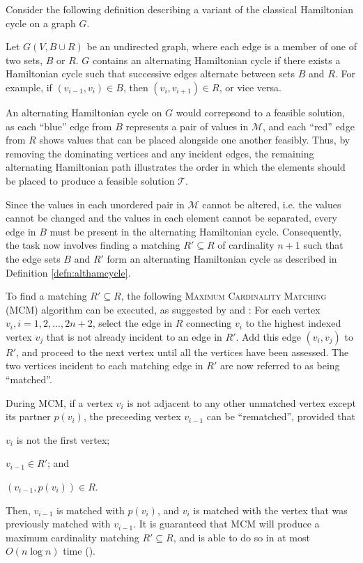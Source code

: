 \documentclass[oribibl]{llncs}
\begin{document}
Consider the following definition describing a variant of the classical Hamiltonian cycle on a graph $G$.
\begin{definition}
	\label{defn:althamcycle}
	Let $G(V, B\cup R)$ be an undirected graph, where each edge is a member of one of two sets, $B$ or $R$. $G$ contains an alternating Hamiltonian cycle if there exists a Hamiltonian cycle such that successive edges alternate between sets $B$ and $R$. For example, if $(v_{i-1}, v_i) \in B$, then $(v_i, v_{i+1}) \in R$, or vice versa.
\end{definition}

An alternating Hamiltonian cycle on $G$ would correpsond to a feasible solution, as each ``blue'' edge from $B$ represents a pair of values in $\mathcal{M}$, and each ``red'' edge from $R$ shows values that can be placed alongside one another feasibly. Thus, by removing the dominating vertices and any incident edges, the remaining alternating Hamiltonian path illustrates the order in which the elements should be placed to produce a feasible solution $\mathcal{T}$.

Since the values in each unordered pair in $\mathcal{M}$ cannot be altered, i.e. the values cannot be changed and the values in each element cannot be separated, every edge in $B$ must be present in the alternating Hamiltonian cycle. Consequently, the task now involves finding a matching $R' \subseteq R$ of cardinality $n+1$ such that the edge sets $B$ and $R'$ form an alternating Hamiltonian cycle as described in Definition \ref{defn:althamcycle}. 

To find a matching $R' \subseteq R$, the following \textsc{Maximum Cardinality Matching} (MCM) algorithm can be executed, as suggested by \cite{mahadev1994} and \cite{becker2010}: For each vertex $v_i, i=1,2,...,2n+2$, select the edge in $R$ connecting $v_i$ to the highest indexed vertex $v_j$ that is not already incident to an edge in $R'$. Add this edge $(v_i, v_j)$ to $R'$, and proceed to the next vertex until all the vertices have been assessed. The two vertices incident to each matching edge in $R'$ are now referred to as being ``matched''.

During MCM, if a vertex $v_i$ is not adjacent to any other unmatched vertex except its partner $p(v_i)$, the preceeding vertex $v_{i-1}$ can be ``rematched'', provided that 
\begin{enumerate*}[label={(\alph*)}]
	\item $v_i$ is not the first vertex; 
	\item $v_{i-1} \in R'$; and
	\item $(v_{i-1}, p(v_i)) \in R$.
\end{enumerate*}
Then, $v_{i-1}$ is matched with $p(v_i)$, and $v_i$ is matched with the vertex that was previously matched with $v_{i-1}$. It is guaranteed that MCM will produce a maximum cardinality matching $R' \subseteq R$, and is able to do so in at most $O(n \log n)$ time (\citealp{mahadev1994}).
\end{document}
